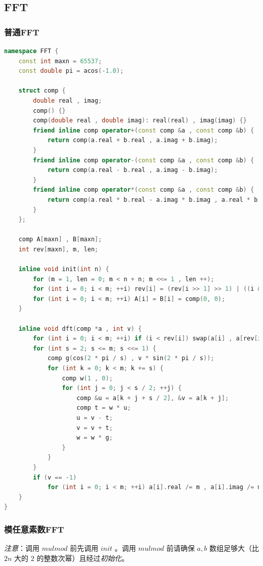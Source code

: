 \documentclass{article}
\begin{document}
\subsection{FFT}

\subsubsection{普通FFT}

\begin{lstlisting}[language=C++]
namespace FFT {
	const int maxn = 65537;
	const double pi = acos(-1.0);

	struct comp {
		double real , imag;
		comp() {}
		comp(double real , double imag): real(real) , imag(imag) {}
		friend inline comp operator+(const comp &a , const comp &b) {
			return comp(a.real + b.real , a.imag + b.imag);
		}
		friend inline comp operator-(const comp &a , const comp &b) {
			return comp(a.real - b.real , a.imag - b.imag);
		}
		friend inline comp operator*(const comp &a , const comp &b) {
			return comp(a.real * b.real - a.imag * b.imag , a.real * b.imag + a.imag * b.real);
		}
	};

	comp A[maxn] , B[maxn];
	int rev[maxn], m, len;

	inline void init(int n) {
		for (m = 1, len = 0; m < n + n; m <<= 1 , len ++);
		for (int i = 0; i < m; ++i) rev[i] = (rev[i >> 1] >> 1) | ((i & 1) << (len - 1));
        for (int i = 0; i < m; ++i) A[i] = B[i] = comp(0, 0);
	}

	inline void dft(comp *a , int v) {
		for (int i = 0; i < m; ++i) if (i < rev[i]) swap(a[i] , a[rev[i]]);
		for (int s = 2; s <= m; s <<= 1) {
			comp g(cos(2 * pi / s) , v * sin(2 * pi / s));
			for (int k = 0; k < m; k += s) {
				comp w(1 , 0);
                for (int j = 0; j < s / 2; ++j) {
					comp &u = a[k + j + s / 2], &v = a[k + j];
					comp t = w * u;
					u = v - t;
					v = v + t;
					w = w * g;
				}
			}
		}
		if (v == -1)
			for (int i = 0; i < m; ++i) a[i].real /= m , a[i].imag /= m;
	}
}
\end{lstlisting}

\subsubsection{模任意素数FFT}

\emph{注意}：调用 $mulmod$ 前先调用 $init$ 。调用 $mulmod$ 前请确保 $a, b$  数组足够大（比 $2n$ 大的 $2$ 的整数次幂）且经过\emph{初始化}。
\end{document}
